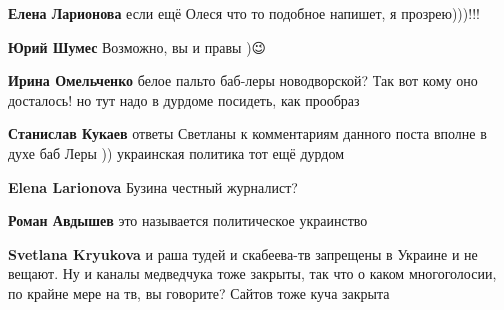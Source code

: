 \begin{itemize}
\begin{itemize}
\textbf{Елена Ларионова} если ещё Олеся что то подобное напишет, я прозрею)))!!!

 
\textbf{Юрий Шумес} Возможно, вы и правы )😉

 
\textbf{Ирина Омельченко} белое пальто баб-леры новодворской? Так вот кому оно досталось!
но тут надо в дурдоме посидеть, как прообраз

 
\textbf{Станислав Кукаев} ответы Светланы к комментариям данного поста вполне в духе баб Леры )) украинская политика тот ещё дурдом

 
\textbf{Elena Larionova} Бузина честный журналист?

 
\textbf{Роман Авдышев} это называется политическое украинство

 
\textbf{Svetlana Kryukova} и раша тудей и скабеева-тв запрещены в Украине и не вещают. Ну и каналы медведчука тоже закрыты, так что о каком многоголосии, по крайне мере на тв, вы говорите? Сайтов тоже куча закрыта


\end{itemize}
\end{itemize}
